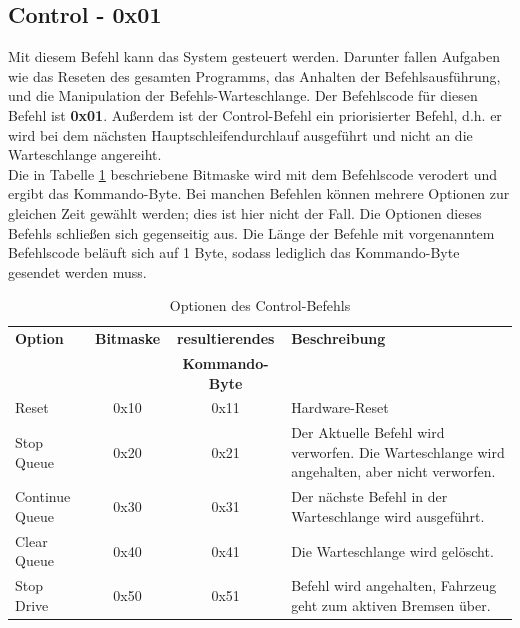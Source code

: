 \subsection{Control - 0x01}
Mit diesem Befehl kann das System gesteuert werden. Darunter fallen Aufgaben wie das
Reseten des gesamten Programms, das Anhalten der Befehlsausführung, und die Manipulation
der Befehls-Warteschlange. Der Befehlscode für diesen Befehl ist \textbf{0x01}. Außerdem ist der Control-Befehl
ein priorisierter Befehl, d.h. er wird bei dem nächsten Hauptschleifendurchlauf ausgeführt und nicht
an die Warteschlange angereiht.\\
Die in Tabelle \ref{protocol_control} beschriebene Bitmaske wird mit dem Befehlscode verodert
und ergibt das Kommando-Byte. Bei manchen Befehlen können mehrere Optionen zur gleichen Zeit
gewählt werden; dies ist hier nicht der Fall. Die Optionen dieses Befehls schließen sich
gegenseitig aus. Die Länge der Befehle mit vorgenanntem Befehlscode beläuft sich auf 1 Byte, sodass
lediglich das Kommando-Byte gesendet werden muss.
\begin{table}[htb]
\begin{center}
	\begin{tabularx}{\linewidth}{|l|c|c|X|}
		\hline
		\textbf{Option} & \textbf{Bitmaske} & \textbf{resultierendes} & \textbf{Beschreibung} \\
		                &                   & \textbf{Kommando-Byte}   & \\
		\hline
		\hline
		Reset 			& 0x10 				& 0x11                    & Hardware-Reset \\
		\hline
		Stop Queue		& 0x20				& 0x21                    & Der Aktuelle Befehl wird verworfen. Die Warteschlange wird angehalten, aber nicht verworfen. \\
		\hline
		Continue Queue	& 0x30				& 0x31                    & Der nächste Befehl in der Warteschlange wird ausgeführt. \\
		\hline
		Clear Queue		& 0x40				& 0x41                    & Die Warteschlange wird gelöscht. \\
		\hline
		Stop Drive		& 0x50				& 0x51                    &Befehl wird angehalten, Fahrzeug geht zum aktiven Bremsen über. \\
		\hline
	\end{tabularx}
	\caption{\label{protocol_control} Optionen des Control-Befehls}
\end{center}
\end{table}

